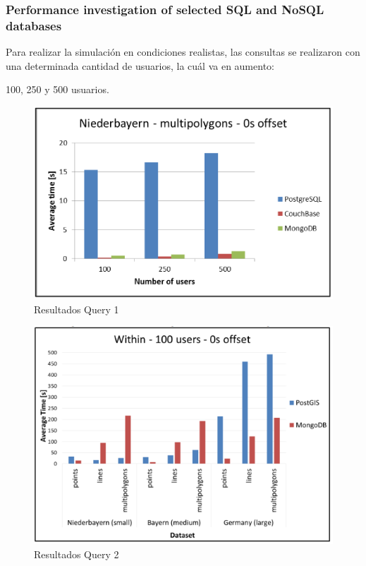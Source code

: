 \begin{frame}
    \frametitle{Performance investigation of selected SQL and NoSQL databases}

    Para realizar la simulación en condiciones realistas, las consultas se realizaron con una determinada cantidad de usuarios, la cuál va en aumento:

    \vspace{-0.4cm}
    
    \begin{center}
        100, 250 y 500 usuarios.
    \end{center}

     

    \begin{minipage}{0.48\textwidth}
        \begin{figure}
            \centering
            \includegraphics[width=\textwidth]{images/geo-g1.png}
            \caption{Resultados Query 1}
        \end{figure}
    \end{minipage}\hfill
    \begin{minipage}{0.48\textwidth}
        \begin{figure}
            \centering
            \includegraphics[width=\textwidth]{images/geo-g2.png}
            \caption{Resultados Query 2}
        \end{figure}
    \end{minipage}
\end{frame}


